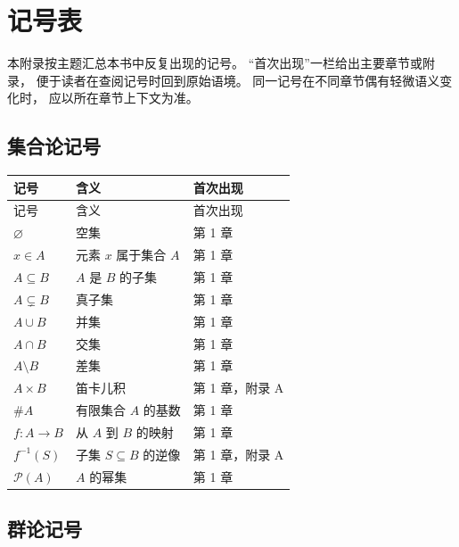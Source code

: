 \chapter{记号表}

本附录按主题汇总本书中反复出现的记号。
“首次出现”一栏给出主要章节或附录，
便于读者在查阅记号时回到原始语境。
同一记号在不同章节偶有轻微语义变化时，
应以所在章节上下文为准。

\section{集合论记号}

\begin{longtable}{p{}p{}p{}}
\toprule
记号 & 含义 & 首次出现 \\
\midrule
\endfirsthead
\toprule
记号 & 含义 & 首次出现 \\
\midrule
\endhead
$\varnothing$ & 空集 & 第 1 章 \\
$x\in A$ & 元素 $x$ 属于集合 $A$ & 第 1 章 \\
$A\subseteq B$ & $A$ 是 $B$ 的子集 & 第 1 章 \\
$A\subsetneq B$ & 真子集 & 第 1 章 \\
$A\cup B$ & 并集 & 第 1 章 \\
$A\cap B$ & 交集 & 第 1 章 \\
$A\setminus B$ & 差集 & 第 1 章 \\
$A\times B$ & 笛卡儿积 & 第 1 章，附录 A \\
$\#A$ & 有限集合 $A$ 的基数 & 第 1 章 \\
$f:A\to B$ & 从 $A$ 到 $B$ 的映射 & 第 1 章 \\
$f^{-1}(S)$ & 子集 $S\subseteq B$ 的逆像 & 第 1 章，附录 A \\
$\mathcal{P}(A)$ & $A$ 的幂集 & 第 1 章 \\
\bottomrule
\end{longtable}

\section{群论记号}

